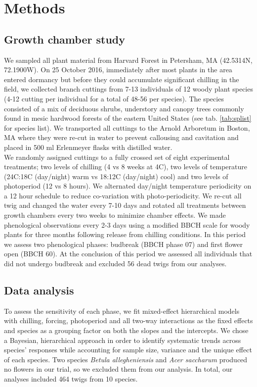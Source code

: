 \documentclass[11pt]{article}\usepackage[]{graphicx}\usepackage[]{color}
\begin{document}
\section*{Methods}

\subsection*{Growth chamber study}

\noindent We sampled all plant material from Harvard Forest in Petersham, MA (42.5314\degree N, 72.1900\degree W). On 25 October 2016, immediately after most plants in the area entered dormancy but before they could accumulate significant chilling in the field,  we collected branch cuttings from 7-13 individuals of 12 woody plant species (4-12 cutting per individual for a total of 48-56 per species). The species consisted of a mix of deciduous shrubs, understory and canopy trees commonly found in mesic hardwood forests of the eastern United States (see tab. \ref{tab:splist} for species list). We transported all cuttings to the Arnold Arboretum in Boston, MA where they were re-cut in water to prevent callousing and cavitation and placed in 500 ml Erlenmeyer flasks with distilled water.\\ 

\noindent We randomly assigned cuttings to a fully crossed set of eight experimental treatments; two levels of chilling (4 vs 8 weeks at 4\degree C), two levels of temperature (24\degree C:18\degree C (day/night) warm vs 18\degree:12\degree C (day/night) cool) and two levels of photoperiod (12 vs 8 hours). We alternated day/night temperature periodicity on a 12 hour schedule to reduce co-variation with photo-periodicity. We re-cut all twig and changed the water every 7-10 days and rotated all treatments between growth chambers every two weeks to minimize chamber effects. We made phenological observations every 2-3 days using a modified BBCH scale for woody plants \citep{Finn2007} for three months following release from chilling conditions. In this period we assess two phenological phases: budbreak (BBCH phase 07) %
and first flower open (BBCH 60). At the conclusion of this period we assessed all individuals that did not undergo budbreak and excluded 56 dead twigs from our analyses. 

\subsection*{Data analysis}
\noindent To assess the sensitivity of each phase, we fit mixed-effect hierarchical models with chilling, forcing, photoperiod and all two-way interactions as the fixed effects and species as a grouping factor on both the slopes and the intercepts. We chose a Bayesian, hierarchical approach in order to identify systematic trends across species' responses while accounting for sample size, variance and the unique effect of each species. Two species \textit{Betula allegheniensis} and \textit{Acer saccharum} produced no flowers in our trial, so we excluded them from our analysis. In total, our analyses included 464 twigs from 10 species. \\
\end{document}

